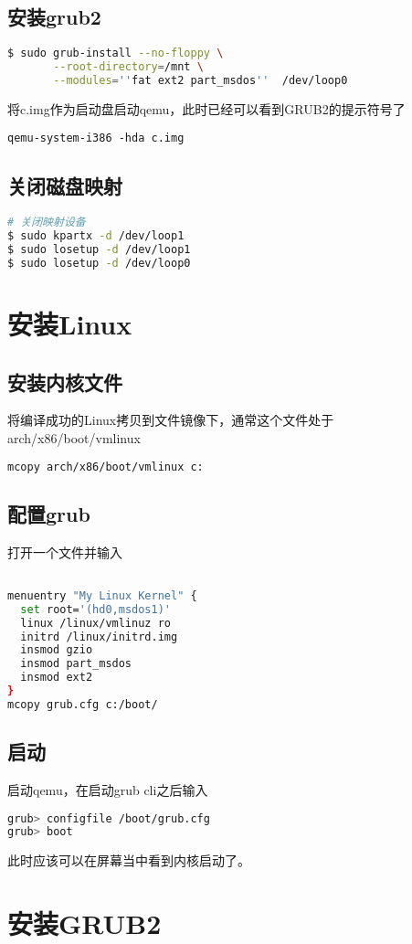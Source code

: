 \subsection{安装grub2}

\begin{lstlisting}[language=bash]
$ sudo grub-install --no-floppy \
       --root-directory=/mnt \
       --modules=''fat ext2 part_msdos''  /dev/loop0
\end{lstlisting}

将c.img作为启动盘启动qemu，此时已经可以看到GRUB2的提示符号了
\begin{lstlisting}
qemu-system-i386 -hda c.img
\end{lstlisting}

\subsection{关闭磁盘映射}
\begin{lstlisting}[language=bash]
# 关闭映射设备
$ sudo kpartx -d /dev/loop1
$ sudo losetup -d /dev/loop1
$ sudo losetup -d /dev/loop0
\end{lstlisting}
\section{安装Linux}
\subsection{安装内核文件}
将编译成功的Linux拷贝到文件镜像下，通常这个文件处于
arch/x86/boot/vmlinux
\begin{lstlisting}[language=bash]
mcopy arch/x86/boot/vmlinux c:
\end{lstlisting}
\subsection{配置grub}
打开一个文件并输入
\begin{lstlisting}[language=bash]

menuentry "My Linux Kernel" {
  set root='(hd0,msdos1)'
  linux /linux/vmlinuz ro
  initrd /linux/initrd.img
  insmod gzio
  insmod part_msdos
  insmod ext2
}
mcopy grub.cfg c:/boot/
\end{lstlisting}


\subsection{启动}
启动qemu，在启动grub cli之后输入
\begin{lstlisting}[language=bash]
grub> configfile /boot/grub.cfg
grub> boot
\end{lstlisting}
此时应该可以在屏幕当中看到内核启动了。
\section{安装GRUB2}
